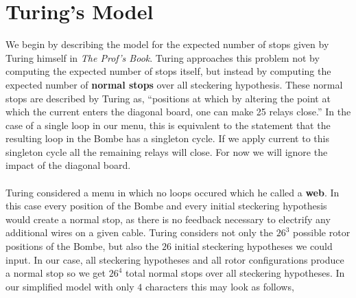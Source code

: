 \section{Turing's Model}
We begin by describing the model for the expected number of stops
given by Turing himself in \emph{The Prof's Book}. Turing approaches this
problem not by computing the expected number of stops itself, but
instead by computing the expected number of {\bf{normal stops}} over
all steckering hypothesis. These normal stops are described by Turing
as, ``positions at which by altering the point at which the current
enters the diagonal board, one can make 25 relays close.'' In the
case of a single loop in our menu, this is equivalent to the
statement that the resulting loop in the Bombe has a singleton cycle.
If we apply current to this singleton cycle all the remaining relays
will close. For now we will ignore the impact of the diagonal board.
\\\\Turing considered a menu in which no loops occured which he
called a {\bf{web}}. In this case every position of the Bombe and
every initial steckering hypothesis would create a normal stop, as
there is no feedback necessary to electrify any additional wires on a
given cable. Turing considers not only the $26^3$ possible rotor
positions of the Bombe, but also the $26$ initial steckering
hypotheses we could input. In our case, all steckering hypotheses and
all rotor configurations produce a normal stop so we get $26^4$ total
normal stops over all steckering hypotheses. In our simplified model
with only $4$ characters this may look as follows,
